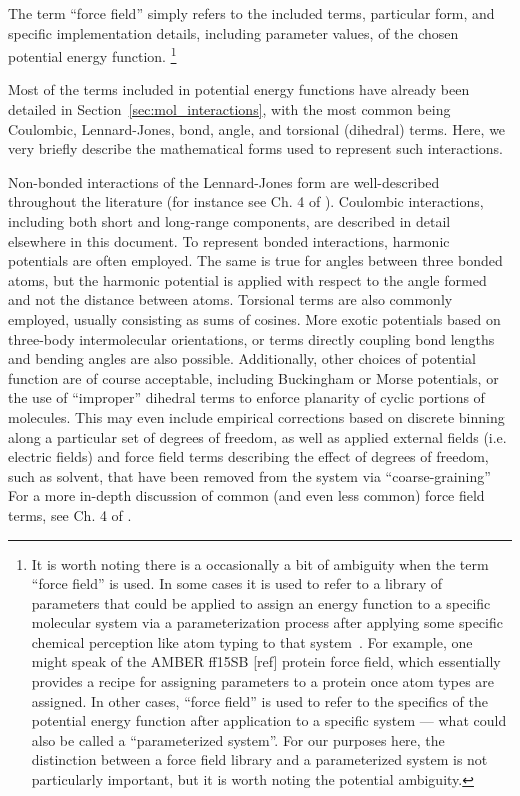 \documentclass[9pt,bestpractices]{livecoms}
\begin{document}
The term ``force field'' simply refers to the included terms, particular form, and specific implementation details, including parameter values, of the 
chosen potential energy function.
\footnote{It is worth noting there is a occasionally a bit of ambiguity when the term ``force field'' is used.
In some cases it is used to refer to a library of parameters that could be applied to assign an energy function to a specific molecular system via a parameterization process after applying some specific chemical perception like atom typing to that system~\cite{Mobley:2018:bioRxiv}.
For example, one might speak of the AMBER ff15SB [ref] protein force field, which essentially provides a recipe for assigning parameters to a protein once atom types are assigned.
In other cases, ``force field'' is used to refer to the specifics of the potential energy function after application to a specific system --- what could also be called a ``parameterized system''. 
For our purposes here, the distinction between a force field library and a parameterized system is not particularly important, but it is worth noting the potential ambiguity. }

Most of the terms included in potential energy functions have already been detailed in Section~\ref{sec:mol_interactions}, with the most common being Coulombic, Lennard-Jones, bond, angle, and torsional (dihedral) terms. 
Here, we very briefly describe the mathematical forms used to represent such interactions.

Non-bonded interactions of the Lennard-Jones form are well-described throughout the literature (for instance see Ch. 4 of \citet{LeachBook}). 
Coulombic interactions, including both short and long-range components, are described in detail elsewhere in this document.
To represent bonded interactions, harmonic potentials are often employed. 
The same is true for angles between three bonded atoms, but the harmonic potential  is applied with respect to the angle formed and not the distance between atoms. 
Torsional terms are also commonly employed, usually consisting as sums of  cosines.
More exotic potentials based on three-body intermolecular  orientations, or terms directly coupling bond lengths and bending angles are 
also possible. 
Additionally, other choices of potential function are of course  acceptable, including Buckingham or Morse potentials, or the use of ``improper'' dihedral terms to enforce planarity of cyclic portions of molecules. 
This may even include empirical corrections based on discrete binning along a particular set of degrees of freedom, as well as applied external  
fields (i.e. electric fields) and force field terms describing the effect of degrees of freedom, such as solvent, that have been removed from the system via 
``coarse-graining''
For a more in-depth discussion of common (and even less common) force field terms, see Ch. 4 of \citet{LeachBook}.
\end{document}
